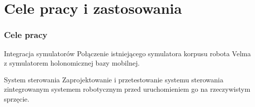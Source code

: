 \section{Cele pracy i zastosowania}

\begin{frame}
\frametitle{Cele pracy}
    \begin{block}{Integracja symulatorów}
    Połączenie istniejącego symulatora korpusu robota Velma z symulatorem holonomicznej bazy mobilnej.
    \end{block}

    \begin{block}{System sterowania}
    Zaprojektowanie i przetestowanie systemu sterowania zintegrowanym systemem robotycznym przed uruchomieniem go na rzeczywistym sprzęcie.
    \end{block}
\end{frame}
